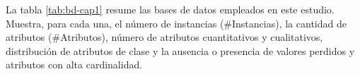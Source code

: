 \begin{table}[H]
	\centering
	\begin{spacing}{1.2}
	\end{spacing}
	\caption{Bases de datos empleadas en la experimentación}
	\label{tab:bd-cap1}
\end{table}

La tabla \ref{tab:bd-cap1} resume las bases de datos empleados en este estudio. Muestra, para cada una, el número de instancias (\#Instancias), la cantidad de atributos (\#Atributos), número de atributos cuantitativos y cualitativos, distribución de atributos de clase y la ausencia o presencia de valores perdidos y atributos con alta cardinalidad.

